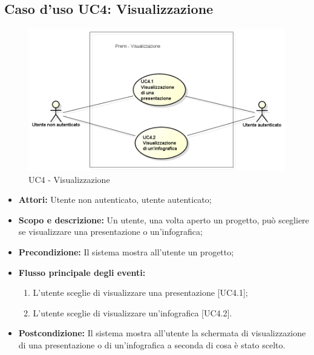 \subsection{Caso d'uso UC4: Visualizzazione}
\begin{figure}[h] 
	\centering 
	\includegraphics[scale=0.45] {img/UC4.png} 
	\caption{UC4 - Visualizzazione} 
\end{figure}

\begin{itemize}
	\item \textbf{Attori:} Utente non autenticato, utente autenticato;
	\item \textbf{Scopo e descrizione:} Un utente, una volta aperto un progetto, può scegliere se visualizzare una presentazione o un'infografica;
	\item \textbf{Precondizione:} Il sistema mostra all'utente un progetto;
	\item \textbf{Flusso principale degli eventi:}
	\begin{enumerate}
		\item L'utente sceglie di visualizzare una presentazione [UC4.1];
		\item L'utente sceglie di visualizzare un'infografica [UC4.2].
	\end{enumerate}
	\item \textbf{Postcondizione:} Il sistema mostra all'utente la schermata di visualizzazione di una presentazione o di un'infografica a seconda di cosa è stato scelto.
\end{itemize}

